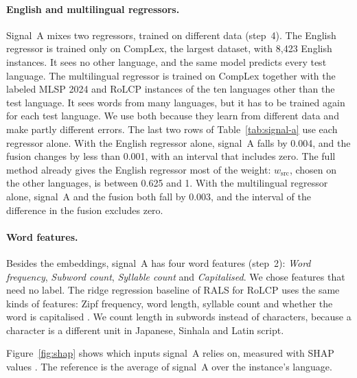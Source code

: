 \documentclass[11pt]{article}
\begin{document}
\paragraph{English and multilingual regressors.} Signal~A mixes two regressors, trained on different %
data (step~4). The English regressor is trained only on CompLex, the largest dataset, with 8{,}423 %
English instances. It sees no other language, and the same model predicts every test language. The %
multilingual regressor is trained on CompLex together with the labeled MLSP 2024 and RoLCP
instances of the ten languages other than the test language. It sees words from many languages, %
but it has to be trained again for each test language. We use both because they learn from
different data and make partly different errors. The last two rows of Table~\ref{tab:signal-a} use
each regressor alone. With the
English regressor alone, signal~A falls by 0.004, and the fusion changes by less than 0.001, with %
an interval that includes zero. The full method already gives the English regressor most of the
weight: $w_{\mathrm{src}}$, chosen on the other languages, is between 0.625 and 1. With the %
multilingual regressor alone, signal~A and the fusion both fall by 0.003, and the interval of the %
difference in the fusion excludes zero.

\paragraph{Word features.} Besides the embeddings, signal~A has four word features (step~2): %
\emph{Word frequency}, \emph{Subword count}, \emph{Syllable count} and \emph{Capitalised}. We chose
features that need no label. The ridge regression baseline of RALS for RoLCP uses the same kinds of %
features: Zipf frequency, word length, syllable count and whether the word is capitalised
\citep{anghel-etal-2025-rals}. We count length in subwords instead of characters, because a
character is a different unit in Japanese, Sinhala and Latin script.
\label{sec:shap}

Figure~\ref{fig:shap} shows which inputs signal~A relies on, measured with SHAP values
\citep{lundberg-lee-2017-unified,lundberg-etal-2020-trees}. The reference is the average of signal~A over the instance's %
language.
\end{document}
